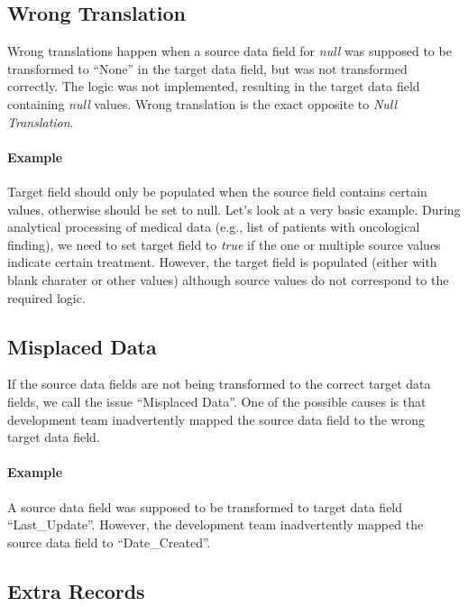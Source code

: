 
\subsection*{Wrong Translation}

Wrong translations happen when a source data field for \textit{null} was supposed to be transformed to \enquote{None} in the target data field, but was not transformed correctly.
The logic was not implemented, resulting in the target data field containing \textit{null} values.
Wrong translation is the exact opposite to \textit{Null Translation}.

\paragraph*{Example} Target field should only be populated when the source field contains certain values, otherwise should be set to null.
Let's look at a very basic example.
During analytical processing of medical data (e.g., list of patients with oncological finding), we need to set target field to \textit{true} if the one or multiple source values indicate certain treatment.
However, the target field is populated (either with blank charater or other values) although source values do not correspond to the required logic.

\subsection*{Misplaced Data}

If the source data fields are not being transformed to the correct target data fields, we call the issue \enquote{Misplaced Data}.
One of the possible causes is that development team inadvertently mapped the source data field to the wrong target data field.

\paragraph*{Example} A source data field was supposed to be transformed to target data field \enquote{Last\_Update}.
However, the development team inadvertently mapped the source data field to \enquote{Date\_Created}.

\subsection*{Extra Records}

